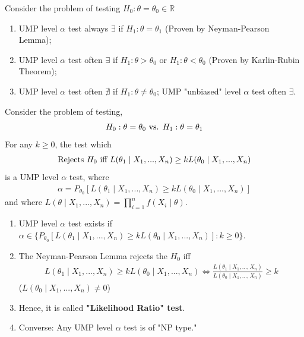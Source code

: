 \documentclass[11pt]{elegantbook}
\begin{document}
Consider the problem of testing $H_0:\theta=\theta_0\in \mathbb{R}$
\begin{enumerate}[$\circ$]
    \item UMP level $\alpha$ test always $\exists$ if $H_1:\theta=\theta_1$ (Proven by Neyman-Pearson Lemma);
    \item UMP level $\alpha$ test often $\exists$ if $H_1:\theta>\theta_0$ or $H_1:\theta<\theta_0$ (Proven by Karlin-Rubin Theorem);
    \item UMP level $\alpha$ test often $\nexists$ if $H_1:\theta\neq \theta_0$; UMP "unbiased" level $\alpha$ test often $\exists$.
\end{enumerate}
\begin{theorem}\label{NP_lemma}
    Consider the problem of testing,
    \begin{equation}
        \begin{aligned}
            H_0:\theta=\theta_0 \textnormal{ vs. }H_1:\theta=\theta_1
        \end{aligned}
        \nonumber
    \end{equation}
    For any $k\geq 0$, the test which
    \begin{equation}
        \begin{aligned}
            \textnormal{Rejects $H_0$ iff }L(\theta_1\mid X_1,...,X_n)\geq k L(\theta_0\mid X_1,...,X_n)
        \end{aligned}
        \nonumber
    \end{equation}
    is a UMP level $\alpha$ test, where
    \begin{equation}
        \begin{aligned}
            \alpha=P_{\theta_0}[L(\theta_1\mid X_1,...,X_n)\geq k L(\theta_0\mid X_1,...,X_n)]
        \end{aligned}
        \nonumber
    \end{equation}
    and where $L(\theta\mid X_1,...,X_n)=\prod_{i=1}^n f(X_i\mid\theta)$.
\end{theorem}
\begin{remark}
    \begin{enumerate}[$\circ$]
        \item UMP level $\alpha$ test exists if $\alpha\in \{P_{\theta_0}[L(\theta_1\mid X_1,...,X_n)\geq k L(\theta_0\mid X_1,...,X_n)]:k\geq 0\}$.
        \item The Neyman-Pearson Lemma rejects the $H_0$ iff
        \begin{equation}
            \begin{aligned}
                L(\theta_1\mid X_1,...,X_n)\geq k L(\theta_0\mid X_1,...,X_n)\Leftrightarrow \frac{L(\theta_1\mid X_1,...,X_n)}{L(\theta_0\mid X_1,...,X_n)}\geq k
            \end{aligned}
            \nonumber
        \end{equation}
        ($L(\theta_0\mid X_1,...,X_n)\neq 0$)
        \item Hence, it is called \textbf{"Likelihood Ratio" test}.
        \item Converse: Any UMP level $\alpha$ test is of "NP type."
    \end{enumerate}
\end{remark}
\end{document}
